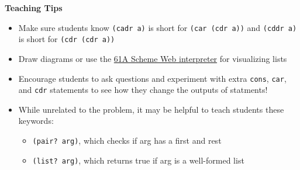 \begin{guide}
\begin{blocksection}
\textbf{Teaching Tips}
\begin{itemize}
  \item Make sure students know \lstinline{(cadr a)} is short for \lstinline{(car (cdr a))} and \lstinline{(cddr a)} is short for \lstinline{(cdr (cdr a))}
  \item Draw diagrams or use the \href{https://code.cs61a.org/}{61A Scheme Web interpreter} for visualizing lists
  \item Encourage students to ask questions and experiment with extra \lstinline{cons}, \lstinline{car}, and \lstinline{cdr} statements to see how they change the outputs of statments!
  \item While unrelated to the problem, it may be helpful to teach students these keywords:
  \begin{itemize}
    \item\lstinline{(pair? arg)}, which checks if arg has a first and rest
    \item\lstinline{(list? arg)}, which returns true if arg is a well-formed list
  \end{itemize}
\end{itemize}
\end{blocksection}
\end{guide}